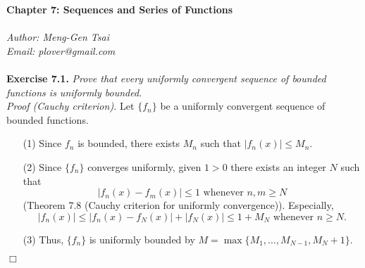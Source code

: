 \documentclass{article}
\begin{document}
\textbf{\Large Chapter 7: Sequences and Series of Functions} \\\\



\emph{Author: Meng-Gen Tsai} \\
\emph{Email: plover@gmail.com} \\\\









\textbf{Exercise 7.1.}
\emph{Prove that every uniformly convergent sequence of bounded functions
is uniformly bounded.} \\

\emph{Proof (Cauchy criterion).}
Let $\{f_n\}$ be a uniformly convergent sequence of bounded functions.
\begin{enumerate}
\item[(1)]
Since $f_n$ is bounded, there exists $M_n$ such that $|f_n(x)| \leq M_n$.

\item[(2)]
Since $\{f_n\}$ converges uniformly, given $1 > 0$ there exists an integer $N$
such that
\[
  |f_n(x) - f_m(x)| \leq 1 \text{ whenever } n, m \geq N
\]
(Theorem 7.8 (Cauchy criterion for uniformly convergence)).
Especially,
\[
  |f_n(x)| \leq |f_n(x) - f_N(x)| + |f_N(x)| \leq 1 + M_N \text{ whenever } n \geq N.
\]

\item[(3)]
Thus, $\{f_n\}$ is uniformly bounded by $M = \max\{ M_1, \ldots, M_{N-1}, M_{N}+1 \}$.
\end{enumerate}
$\Box$ \\\\



\end{document}

